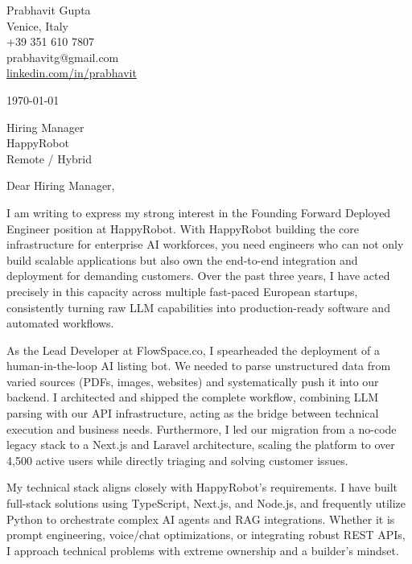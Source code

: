 \documentclass[11pt,a4paper]{article}
\begin{document}
\pagestyle{empty}

\begin{flushright}
Prabhavit Gupta\\
Venice, Italy\\
+39 351 610 7807\\
prabhavitg@gmail.com\\
\href{https://www.linkedin.com/in/prabhavit/}{linkedin.com/in/prabhavit}\\
\end{flushright}

\vspace{2em}

\noindent
\today

\vspace{1em}

\noindent
Hiring Manager\\
HappyRobot\\
Remote / Hybrid

\vspace{2em}

\noindent
Dear Hiring Manager,

\vspace{1em}
\noindent
I am writing to express my strong interest in the Founding Forward Deployed Engineer position at HappyRobot. With HappyRobot building the core infrastructure for enterprise AI workforces, you need engineers who can not only build scalable applications but also own the end-to-end integration and deployment for demanding customers. Over the past three years, I have acted precisely in this capacity across multiple fast-paced European startups, consistently turning raw LLM capabilities into production-ready software and automated workflows.

\vspace{1em}
\noindent
As the Lead Developer at FlowSpace.co, I spearheaded the deployment of a human-in-the-loop AI listing bot. We needed to parse unstructured data from varied sources (PDFs, images, websites) and systematically push it into our backend. I architected and shipped the complete workflow, combining LLM parsing with our API infrastructure, acting as the bridge between technical execution and business needs. Furthermore, I led our migration from a no-code legacy stack to a Next.js and Laravel architecture, scaling the platform to over 4,500 active users while directly triaging and solving customer issues.

\vspace{1em}
\noindent
My technical stack aligns closely with HappyRobot's requirements. I have built full-stack solutions using TypeScript, Next.js, and Node.js, and frequently utilize Python to orchestrate complex AI agents and RAG integrations. Whether it is prompt engineering, voice/chat optimizations, or integrating robust REST APIs, I approach technical problems with extreme ownership and a builder's mindset. 
\end{document}
